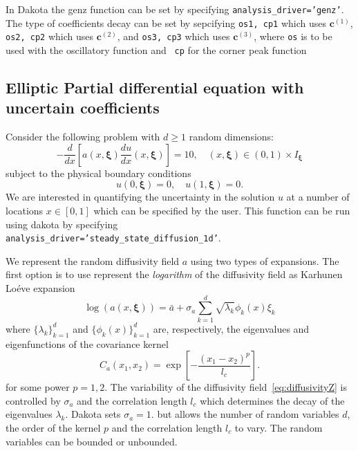 In Dakota the genz function can be set by specifying
{\tt analysis\_driver='genz'}. The type of coefficients decay can be
set by sepcifying {\tt os1, cp1} which uses $\mathbf{c}^{(1)}$,
{\tt os2, cp2} which uses
$\mathbf{c}^{(2)}$, and {\tt os3, cp3} which uses $\mathbf{c}^{(3)}$,
where {\tt os} is to be used with the oscillatory function and {\tt
 cp} for the corner peak function

\subsection{Elliptic Partial differential equation with uncertain
  coefficients}
Consider the following problem with $d \ge 1$ random dimensions:
\begin{equation}\label{eq:hetrogeneous-diffusion}
-\frac{d}{dx}\left[a(x,\boldsymbol{\xi})\frac{du}{dx}(x,\boldsymbol{\xi})\right] = 10,\quad
(x,\boldsymbol{\xi})\in(0,1)\times I_{\boldsymbol{\xi}}
\end{equation}
subject to the physical boundary conditions
\begin{equation}
u(0,\boldsymbol{\xi})=0,\quad u(1,\boldsymbol{\xi})=0.
\end{equation}
We are interested in quantifying the uncertainty in the solution $u$
at a number of locations $x\in[0,1]$ which can be specified by the
user. This function can be run using dakota by specifying\\
{\tt analysis\_driver='steady\_state\_diffusion\_1d'}.

We represent the random diffusivity field $a$ using two types of
expansions. The first option is to use represent the {\it logarithm} of the
diffusivity field as Karhunen Lo\'{e}ve expansion
\begin{equation}\label{eq:diffusivityZ}
\log(a(x,\boldsymbol{\xi}))=\bar{a}+\sigma_a\sum_{k=1}^d\sqrt{\lambda_k}\phi_k(x)\xi_k
\end{equation}
where $\{\lambda_k\}_{k=1}^d$ and $\{\phi_k(x)\}_{k=1}^d$ are, respectively,
the eigenvalues and eigenfunctions of the covariance kernel
\begin{equation}\label{eq:heat-eq-qoi}
 C_a(x_1,x_2) = \exp\left[-\frac{(x_1-x_2)^p}{l_c}\right].
\end{equation}
for some power $p=1,2$.
The variability of the diffusivity field~\eqref{eq:diffusivityZ} is
controlled by $\sigma_a$ and the correlation length
$l_c$ which determines the decay of the eigenvalues
$\lambda_k$. Dakota sets $\sigma_a=1.$ but allows the number of random
variables $d$, the order of the kernel $p$ and the correlation
length $l_c$ to vary. The random variables can be bounded or unbounded.

